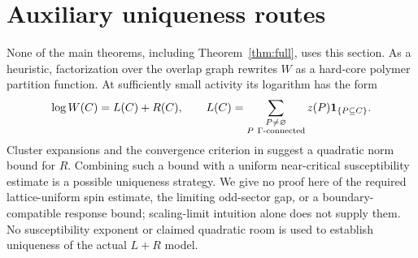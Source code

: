 \section{Auxiliary uniqueness routes}\label{sec:uniqueness}
None of the main theorems, including Theorem~\ref{thm:full}, uses this section. As a heuristic, factorization over the overlap graph rewrites $W$ as a hard-core polymer partition function. At sufficiently small activity its logarithm has the form
\begin{equation}
 \log W(C)=L(C)+R(C),\qquad
 L(C)=\sum_{\substack{P\ne\varnothing\\P\ \Gamma\text{-connected}}}
       z(P)\mathbf 1_{\{P\subseteq C\}} .
 \label{eq:LplusR}
\end{equation}
Cluster expansions \cite{KP} and the convergence criterion in \cite[Theorem 1]{FP} suggest a quadratic norm bound for $R$. Combining such a bound with a uniform near-critical susceptibility estimate is a possible uniqueness strategy. We give no proof here of the required lattice-uniform spin estimate, the limiting odd-sector gap, or a boundary-compatible response bound; scaling-limit intuition alone does not supply them. No susceptibility exponent or claimed quadratic room is used to establish uniqueness of the actual $L+R$ model.


